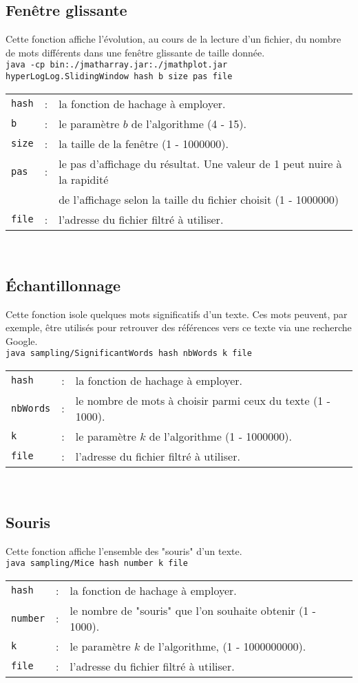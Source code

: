 \documentclass[12pt,a4paper,titlepage]{article}
\newcommand{\code}[1]{ \texttt{\footnotesize #1} }
\begin{document}
\subsection{Fenêtre glissante}
Cette fonction affiche l'évolution, au cours de la lecture d'un fichier, du nombre de mots différents dans une fenêtre glissante de taille donnée. \\
\code{java -cp bin:./jmatharray.jar:./jmathplot.jar hyperLogLog.SlidingWindow hash b size pas file}\\
\begin{tabular}{lcl}
\code{hash} &:& la fonction de hachage à employer.\\
\code{b} &:& le paramètre $b$ de l'algorithme (4 - 15).\\
\code{size} &:& la taille de la fenêtre (1 - 1000000).\\
\code{pas}&:& le pas d'affichage du résultat. Une valeur de 1 peut nuire à la rapidité\\
&& de l'affichage selon la taille du fichier choisit (1 - 1000000)\\
\code{file} &:& l'adresse du fichier filtré à utiliser.
\end{tabular}\\


\subsection{Échantillonnage}
Cette fonction isole quelques mots significatifs d'un texte. Ces mots peuvent, par exemple, être utilisés pour retrouver des références vers ce texte via une recherche Google. \\
\code{java  sampling/SignificantWords hash nbWords k file}\\
\begin{tabular}{lcl}
\code{hash} &:& la fonction de hachage à employer.\\
\code{nbWords} &:& le nombre de mots à choisir parmi ceux du texte (1 - 1000).\\
\code{k} &:& le paramètre $k$ de l'algorithme (1 - 1000000).\\
\code{file} &:& l'adresse du fichier filtré à utiliser.
\end{tabular}\\


\newpage
\subsection{Souris}
Cette fonction affiche l'ensemble des "souris" d'un texte.\\
\code{java  sampling/Mice hash number k file}\\
\begin{tabular}{lcl}
\code{hash} &:& la fonction de hachage à employer.\\
\code{number} &:& le nombre de "souris" que l'on souhaite obtenir (1 - 1000).\\
\code{k} &:& le paramètre $k$ de l'algorithme, (1 - 1000000000).\\
\code{file} &:& l'adresse du fichier filtré à utiliser.
\end{tabular}\\
\end{document}
